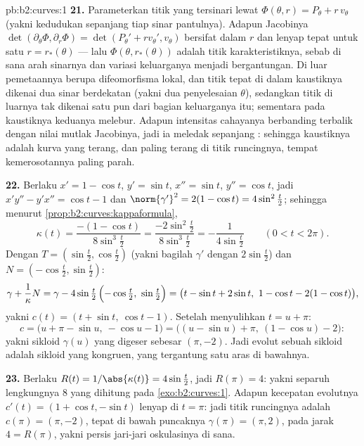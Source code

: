 \begin{solution}{pb:b2:curves:1}
\textbf{21.} Parameterkan titik yang tersinari lewat
$\Phi(\theta, r) = P_\theta + r\,v_\theta$ (yakni kedudukan sepanjang
tiap sinar pantulnya). Adapun  Jacobinya
$\det(\partial_\theta\Phi, \partial_r\Phi) =
\det(P_\theta' + rv_\theta', v_\theta)$ bersifat  dalam $r$ dan
lenyap tepat untuk satu $r = r_*(\theta)$ --- lalu
$\Phi(\theta, r_*(\theta))$ adalah titik karakteristiknya, sebab
di sana arah sinarnya dan variasi keluarganya menjadi
bergantungan. Di luar  pemetaannya berupa difeomorfisma lokal,
dan titik tepat di dalam kaustiknya dikenai dua sinar berdekatan
(yakni dua penyelesaian $\theta$), sedangkan titik di luarnya tak dikenai satu pun dari
bagian keluarganya itu; sementara pada kaustiknya keduanya melebur. Adapun
intensitas cahayanya berbanding terbalik dengan nilai mutlak Jacobinya,
jadi ia meledak sepanjang : sehingga kaustiknya adalah
kurva yang terang, dan paling terang di titik runcingnya, tempat
kemerosotannya paling parah.

\textbf{22.} Berlaku $x' = 1 - \cos t$, $y' = \sin t$, $x'' = \sin
t$, $y'' = \cos t$, jadi $x'y'' - y'x'' = \cos t - 1$ dan
$\norm{\gamma'}^2 = 2(1 - \cos t) = 4\sin^2\tfrac t2$;
sehingga menurut \cref{prop:b2:curves:kappaformula},
\[
\kappa(t) = \frac{-(1 - \cos t)}{8\sin^3\tfrac t2}
= \frac{-2\sin^2\tfrac t2}{8\sin^3\tfrac t2}
= -\frac1{4\sin\tfrac t2}
\qquad (0 < t < 2\pi).
\]
Dengan $T = (\sin\tfrac t2, \cos\tfrac t2)$ (yakni bagilah $\gamma'$
dengan $2\sin\tfrac t2$) dan $N = (-\cos\tfrac t2, \sin\tfrac
t2)$:
\[
\gamma + \frac1\kappa N
= \gamma - 4\sin\tfrac t2\,\Bigl(-\cos\tfrac t2,\
\sin\tfrac t2\Bigr)
= \bigl(t - \sin t + 2\sin t,\ 1 - \cos t - 2(1 - \cos
t)\bigr),
\]
yakni $c(t) = (t + \sin t,\ \cos t - 1)$. Setelah menyulihkan $t = u
+ \pi$:
\[
c = \bigl(u + \pi - \sin u,\ -\cos u - 1\bigr)
= \bigl((u - \sin u) + \pi,\ (1 - \cos u) - 2\bigr) :
\]
yakni sikloid $\gamma(u)$ yang digeser sebesar $(\pi, -2)$. Jadi
evolut sebuah sikloid adalah sikloid yang kongruen, yang tergantung satu
aras di bawahnya.

\textbf{23.} Berlaku $R(t) = 1/\abs{\kappa(t)} = 4\sin\tfrac t2$, jadi
$R(\pi) = 4$: yakni separuh \omterm{def:b2:curves:length}{panjang} lengkungnya $8$ yang dihitung pada
\cref{exo:b2:curves:1}. Adapun kecepatan evolutnya $c'(t) = (1 +
\cos t, -\sin t)$ lenyap di $t = \pi$: jadi titik runcingnya adalah $c(\pi)
= (\pi, -2)$, tepat di bawah puncaknya $\gamma(\pi) = (\pi,
2)$, pada jarak $4 = R(\pi)$, yakni persis 
jari-jari oskulasinya di sana.


\end{solution}
